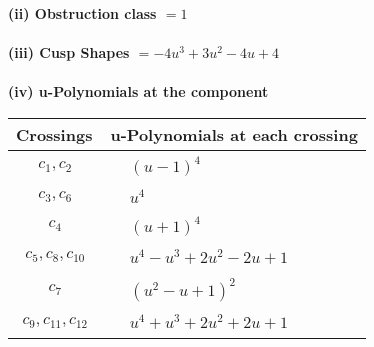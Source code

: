 \documentclass[1p]{elsarticle_modified}
\theoremstyle{definition}
\begin{document}
\flushleft \textbf{(ii) Obstruction class $= 1$}\\~\\
\flushleft \textbf{(iii) Cusp Shapes $= -4 u^3+3 u^2-4 u+4$}\\~\\
\newpage\renewcommand{\arraystretch}{1}
\flushleft \textbf{(iv) u-Polynomials at the component}\newline \\
\begin{tabular}{m{50pt}|m{274pt}}
Crossings & \hspace{64pt}u-Polynomials at each crossing \\
\hline $$\begin{aligned}c_{1},c_{2}\end{aligned}$$&$\begin{aligned}
&(u-1)^4
\end{aligned}$\\
\hline $$\begin{aligned}c_{3},c_{6}\end{aligned}$$&$\begin{aligned}
&u^4
\end{aligned}$\\
\hline $$\begin{aligned}c_{4}\end{aligned}$$&$\begin{aligned}
&(u+1)^4
\end{aligned}$\\
\hline $$\begin{aligned}c_{5},c_{8},c_{10}\end{aligned}$$&$\begin{aligned}
&u^4- u^3+2 u^2-2 u+1
\end{aligned}$\\
\hline $$\begin{aligned}c_{7}\end{aligned}$$&$\begin{aligned}
&(u^2- u+1)^2
\end{aligned}$\\
\hline $$\begin{aligned}c_{9},c_{11},c_{12}\end{aligned}$$&$\begin{aligned}
&u^4+u^3+2 u^2+2 u+1
\end{aligned}$\\
\hline
\end{tabular}\\~\\
\end{document}
